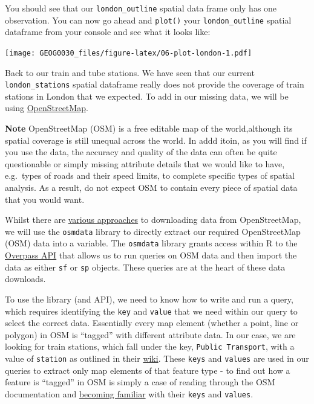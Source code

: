 \documentclass[
]{book}
\begin{document}
You should see that our \texttt{london\_outline} spatial data frame only has one observation. You can now go ahead and \texttt{plot()} your \texttt{london\_outline} spatial dataframe from your console and see what it looks like:

\texttt{[image: GEOG0030\_files/figure-latex/06-plot-london-1.pdf]}

Back to our train and tube stations. We have seen that our current \texttt{london\_stations} spatial dataframe really does not provide the coverage of train stations in London that we expected. To add in our missing data, we will be using \href{https://www.openstreetmap.org/\#map=6/54.910/-3.432}{OpenStreetMap}.

\textbf{Note}
OpenStreetMap (OSM) is a free editable map of the world,although its spatial coverage is still unequal across the world. In addd
itoin, as you will find if you use the data, the accuracy and quality of the data can often be quite questionable or simply missing attribute details that we would like to have, e.g.~types of roads and their speed limits, to complete specific types of spatial analysis. As a result, do not expect OSM to contain every piece of spatial data that you would want.

Whilst there are \href{https://wiki.openstreetmap.org/wiki/Downloading_data}{various approaches} to downloading data from OpenStreetMap, we will use the \texttt{osmdata} library to directly extract our required OpenStreetMap (OSM) data into a variable. The \texttt{osmdata} library grants access within R to the \href{https://overpass-turbo.eu}{Overpass API} that allows us to run queries on OSM data and then import the data as either \texttt{sf} or \texttt{sp} objects. These queries are at the heart of these data downloads.

To use the library (and API), we need to know how to write and run a query, which requires identifying the \texttt{key} and \texttt{value} that we need within our query to select the correct data. Essentially every map element (whether a point, line or polygon) in OSM is ``tagged'' with different attribute data. In our case, we are looking for train stations, which fall under the key, \texttt{Public\ Transport}, with a value of \texttt{station} as outlined in their \href{https://wiki.OpenStreetMap.org/wiki/Key:public_transport}{wiki}. These \texttt{keys} and \texttt{values} are used in our queries to extract only map elements of that feature type - to find out how a feature is ``tagged'' in OSM is simply a case of reading through the OSM documentation and \href{https://wiki.openstreetmap.org/wiki/Tags}{becoming familiar} with their \texttt{keys} and \texttt{values}.
\end{document}
